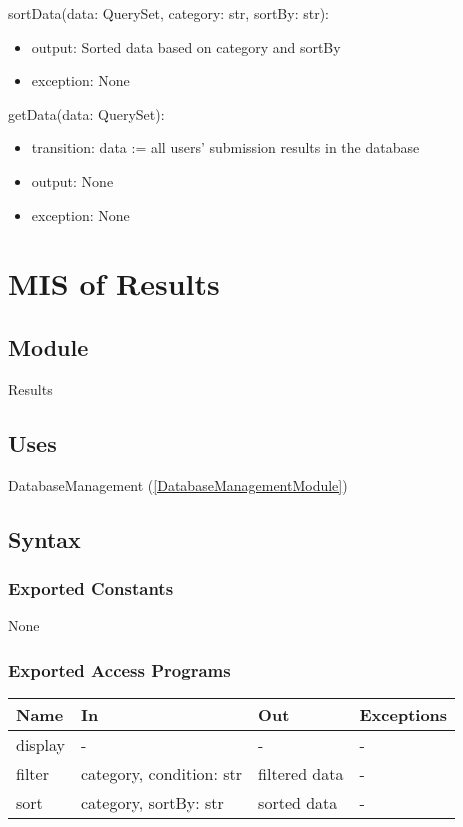 \documentclass[12pt, titlepage]{article}
\begin{document}
\noindent sortData(data: QuerySet, category: str, sortBy: str):
\begin{itemize}
\item output: Sorted data based on category and sortBy
\item exception: None
\end{itemize}

\noindent getData(data: QuerySet):
\begin{itemize}
\item transition: data := all users' submission results in the database
\item output: None
\item exception: None
\end{itemize}

\newpage

\section{MIS of Results} \label{ResultsModule}

\subsection{Module}

Results

\subsection{Uses}

DatabaseManagement (\ref{DatabaseManagementModule})

\subsection{Syntax}

\subsubsection{Exported Constants}

None

\subsubsection{Exported Access Programs}

\begin{center}
\begin{tabular}{p{2cm} p{4cm} p{4cm} p{2cm}}
\hline
\textbf{Name} & \textbf{In} & \textbf{Out} & \textbf{Exceptions} \\
\hline
display & - & - & - \\
filter & category, condition: str & filtered data & - \\
sort & category, sortBy: str & sorted data & - \\
\hline
\end{tabular}
\end{center}
\end{document}
